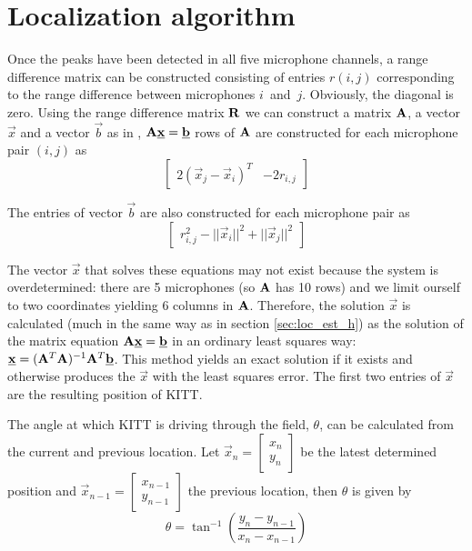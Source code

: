 \documentclass[11pt,titlepage]{report}
\begin{document}
\section{Localization algorithm}
\label{sec:loc_alg}
Once the peaks have been detected in all five microphone channels, a range difference matrix can be constructed consisting of entries $r(i,j)$ corresponding to the range difference between microphones $i$~and~$j$. Obviously, the diagonal is zero. 
Using the range difference matrix $\mathbf{R}$ we can construct a matrix $\mathbf{A}$, a vector $\vec{x}$ and a vector $\vec{b}$ as in \cite{epo4-manual}, $\mathbf{A}\mathbf{\underline{x}}=\mathbf{\underline{b}}$ rows of $\mathbf{A}$ are constructed for each microphone pair $(i,j)$ as
\begin{equation}
\begin{bmatrix}
2(\vec{x}_j-\vec{x}_i)^T & -2r_{i,j}
\end{bmatrix}
\end{equation}

The entries of vector $\vec{b}$ are also constructed for each microphone pair as
\begin{equation}
\begin{bmatrix}
r_{i,j}^2-||\vec{x}_i||^2+||\vec{x}_j||^2
\end{bmatrix}
\end{equation}

The vector $\vec{x}$ that solves these equations may not exist because the system is overdetermined: there are \num{5} microphones (so $\mathbf{A}$ has \num{10} rows) and we limit ourself to two coordinates yielding \num{6} columns in $\mathbf{A}$. Therefore, the solution $\vec{x}$ is calculated (much in the same way as in section \ref{sec:loc_est_h}) as the solution of the matrix equation $\mathbf{A}\mathbf{\underline{x}}=\mathbf{\underline{b}}$ in an ordinary least squares way: $\mathbf{\underline{x}}=(\mathbf{A}^T\mathbf{A})^{-1}\mathbf{A}^T\mathbf{\underline{b}}$. This method yields an exact solution if it exists and otherwise produces the $\vec{x}$ with the least squares error. The first two entries of $\vec{x}$ are the resulting position of KITT. 

The angle at which KITT is driving through the field, $\theta$, can be calculated from the current and previous location. Let $\vec{x}_n=\begin{bmatrix}x_n\\y_n\end{bmatrix}$ be the latest determined position and $\vec{x}_{n-1}=\begin{bmatrix}x_{n-1}\\y_{n-1}\end{bmatrix}$ the previous location, then $\theta$ is given by
\begin{equation}
\theta = \tan^{-1}\left(\frac{y_n-y_{n-1}}{x_n-x_{n-1}}\right)
\end{equation}
\end{document}
